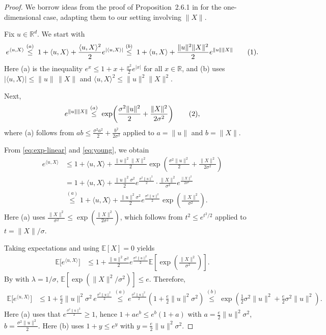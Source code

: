 \documentclass[10pt]{article}
\begin{document}
\begin{proof}
We borrow ideas from the proof of Proposition~2.6.1 in \cite{vershynin2025hdp}
for the one-dimensional case, adapting them to our setting involving $\|X\|$.


Fix $u\in\mathbb{R}^d$. We start with
\begin{align*}
e^{\langle u,X\rangle}
\overset{(a)}{\le}\;
1+\langle u,X\rangle + \frac{\langle u,X\rangle^2}{2}e^{|\langle u,X\rangle|}
\overset{(b)}{\le}\;
1+\langle u,X\rangle + \frac{\|u\|^2\|X\|^2}{2}e^{\|u\|\|X\|} \refstepcounter{equation}\tag{\theequation}\label{eq:exp-linear}.
\end{align*}
Here (a) is the inequality $e^x \le 1 + x + \frac{x^2}{2}e^{|x|}$ for all $x\in\mathbb{R}$,
and (b) uses $|\langle u,X\rangle|\le \|u\|\,\|X\|$ and $\langle u,X\rangle^2\le \|u\|^2\|X\|^2$.

Next,
\begin{align*}
e^{\|u\|\|X\|}
\overset{(a)}{\le}\;
\exp\!\left(\frac{\sigma^2\|u\|^2}{2}+\frac{\|X\|^2}{2\sigma^2}\right) \refstepcounter{equation}\tag{\theequation}\label{eq:young},
\end{align*}
where (a) follows from $ab \le \frac{\sigma^2 a^2}{2}+\frac{b^2}{2\sigma^2}$ applied to
$a=\|u\|$ and $b=\|X\|$.

From \eqref{eq:exp-linear} and \eqref{eq:young}, we obtain
\begin{align*}
e^{\langle u,X\rangle}
&\le 1+\langle u,X\rangle
+ \frac{\|u\|^2\|X\|^2}{2}\exp\!\left(\frac{\sigma^2\|u\|^2}{2}+\frac{\|X\|^2}{2\sigma^2}\right) \\
&= 1+\langle u,X\rangle
+ \frac{\|u\|^2\sigma^2}{2}e^{\frac{\sigma^2\|u\|^2}{2}}
\cdot \frac{\|X\|^2}{\sigma^2}e^{\frac{\|X\|^2}{2\sigma^2}} \\
&\overset{(a)}{\le}
1+\langle u,X\rangle
+ \frac{\|u\|^2\sigma^2}{2}e^{\frac{\sigma^2\|u\|^2}{2}}
\exp\!\left(\frac{\|X\|^2}{\sigma^2}\right).
\end{align*}
Here (a) uses $\frac{\|X\|^2}{\sigma^2}\le \exp\!\left(\frac{\|X\|^2}{2\sigma^2}\right)$,
which follows from $t^2\le e^{t^2/2}$ applied to $t=\|X\|/\sigma$.

Taking expectations and using $\mathbb{E}[X]=0$ yields
\begin{align*}
\mathbb{E}\big[e^{\langle u,X\rangle}\big]
&\le 1 + \frac{\|u\|^2\sigma^2}{2}e^{\frac{\sigma^2\|u\|^2}{2}}
\mathbb{E}\!\left[\exp\!\left(\frac{\|X\|^2}{\sigma^2}\right)\right].
\end{align*}
By  with $\lambda = 1/\sigma$,
$\mathbb{E}[\exp(\|X\|^2/\sigma^2)]\le e$. 
Therefore,
\begin{align*}
\mathbb{E}\big[e^{\langle u,X\rangle}\big]
&\le 1 + \frac{e}{2}\|u\|^2\sigma^2\,e^{\frac{\sigma^2\|u\|^2}{2}}
\overset{(a)}{\le}
e^{\frac{\sigma^2\|u\|^2}{2}}
\left(1+\frac{e}{2}\|u\|^2\sigma^2\right)
\overset{(b)}{\le}
\exp\!\left(\frac{1}{2}\sigma^2\|u\|^2+\frac{e}{2}\sigma^2\|u\|^2\right).
\end{align*}
Here (a) uses that $e^{\frac{\sigma^2\|u\|^2}{2}}\ge 1$, hence
$1+ae^{b}\le e^{b}(1+a)$ with $a=\frac{e}{2}\|u\|^2\sigma^2$, $b=\frac{\sigma^2\|u\|^2}{2}$.
Here (b) uses $1+y\le e^y$ with $y=\frac{e}{2}\|u\|^2\sigma^2$.


\end{proof}
\end{document}
